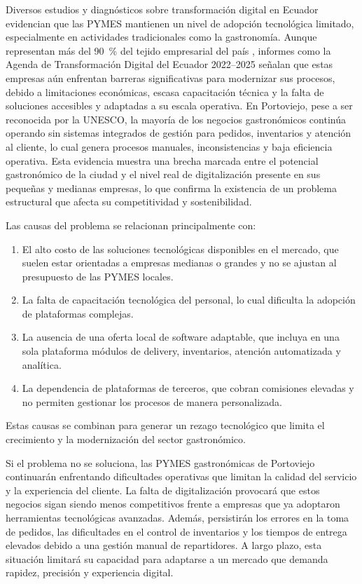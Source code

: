 Diversos estudios y diagnósticos sobre transformación digital en Ecuador evidencian que las PYMES mantienen un nivel de adopción tecnológica limitado, especialmente en actividades tradicionales como la gastronomía. Aunque representan más del 90~\% del tejido empresarial del país \parencite{INEC2023}, informes como la Agenda de Transformación Digital del Ecuador 2022--2025 \parencite{Arcotel_2022} señalan que estas empresas aún enfrentan barreras significativas para modernizar sus procesos, debido a limitaciones económicas, escasa capacitación técnica y la falta de soluciones accesibles y adaptadas a su escala operativa. En Portoviejo, pese a ser reconocida por la UNESCO, la mayoría de los negocios gastronómicos continúa operando sin sistemas integrados de gestión para pedidos, inventarios y atención al cliente, lo cual genera procesos manuales, inconsistencias y baja eficiencia operativa. Esta evidencia muestra una brecha marcada entre el potencial gastronómico de la ciudad y el nivel real de digitalización presente en sus pequeñas y medianas empresas, lo que confirma la existencia de un problema estructural que afecta su competitividad y sostenibilidad.

Las causas del problema se relacionan principalmente con:

\begin{enumerate}
    \item El alto costo de las soluciones tecnológicas disponibles en el mercado, que suelen estar orientadas a empresas medianas o grandes y no se ajustan al presupuesto de las PYMES locales.
    \item La falta de capacitación tecnológica del personal, lo cual dificulta la adopción de plataformas complejas.
    \item La ausencia de una oferta local de software adaptable, que incluya en una sola plataforma módulos de delivery, inventarios, atención automatizada y analítica.
    \item La dependencia de plataformas de terceros, que cobran comisiones elevadas y no permiten gestionar los procesos de manera personalizada.
\end{enumerate}

Estas causas se combinan para generar un rezago tecnológico que limita el crecimiento y la modernización del sector gastronómico.

Si el problema no se soluciona, las PYMES gastronómicas de Portoviejo continuarán enfrentando dificultades operativas que limitan la calidad del servicio y la experiencia del cliente. La falta de digitalización provocará que estos negocios sigan siendo menos competitivos frente a empresas que ya adoptaron herramientas tecnológicas avanzadas. Además, persistirán los errores en la toma de pedidos, las dificultades en el control de inventarios y los tiempos de entrega elevados debido a una gestión manual de repartidores. A largo plazo, esta situación limitará su capacidad para adaptarse a un mercado que demanda rapidez, precisión y experiencia digital.

